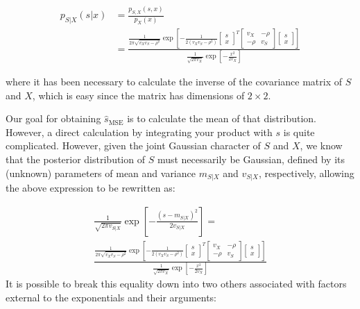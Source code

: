\begin{equation}
\begin{split}
p_{S|X}(s|x) & = \frac{p_{S,X}(s,x)}{p_X(x)} \\
& = \displaystyle\frac{\displaystyle\frac{1}{2\pi \sqrt{v_X v_S - \rho^2}}\exp\left[-\displaystyle\frac{1}{2(v_X v_S - \rho^2)}\left[\begin{array}{c} s \\ x \end{array}\right]^T\left[\begin{array}{cc} v_X & -\rho \\ -\rho & v_S \end{array}\right] \left[\begin{array}{c} s \\ x \end{array}\right]\right]}{\displaystyle\frac{1}{\sqrt{2\pi v_X}} \exp\left[-\displaystyle\frac{x^2}{2 v_X}\right]}
\end{split}
\end{equation}

where it has been necessary to calculate the inverse of the covariance matrix of $S$ and $X$, which is easy since the matrix has dimensions of $2 \times 2$.

Our goal for obtaining $\hat s_{\text{MSE}}$ is to calculate the mean of that distribution. However, a direct calculation by integrating your product with $s$ is quite complicated. However, given the joint Gaussian character of $S$ and $X$, we know that the posterior distribution of $S$ must necessarily be Gaussian, defined by its (unknown) parameters of mean and variance $m_{S|X}$ and $v_{S|X}$, respectively, allowing the above expression to be rewritten as:

\begin{multline}
\frac{1}{\sqrt{2\pi v_{S|X}}} \exp\left[ -\frac{(s - m_{S|X})^2}{2 v_{S|X}}\right] = \\ \displaystyle\frac{\displaystyle\frac{1}{2\pi \sqrt{v_X v_S - \rho^2}}\exp\left[-\displaystyle\frac{1}{2(v_X v_S - \rho^2)}\left[\begin{array}{c} s \\ x \end{array}\right]^T\left[\begin{array}{cc} v_X & -\rho \\ -\rho & v_S \end{array}\right] \left[\begin{array}{c} s \\ x \end{array}\right]\right]}{\displaystyle\frac{1}{\sqrt{2\pi v_X}} \exp\left[-\displaystyle\frac{x^2}{2 v_X}\right]}
\end{multline}
It is possible to break this equality down into two others associated with factors external to the exponentials and their arguments:

